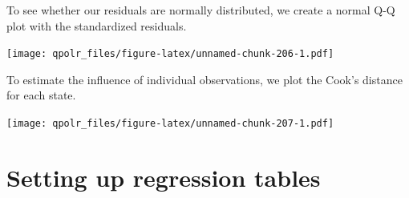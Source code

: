 \documentclass[12pt,oneside]{reedthesis}
\theoremstyle{definition}
\theoremstyle{definition}
\theoremstyle{definition}
\theoremstyle{remark}
\begin{document}
  To see whether our residuals are normally distributed, we create a
  normal Q-Q plot with the standardized residuals.
  \begin{Shaded}
  \begin{Highlighting}[]
  \OperatorTok{+}
  \StringTok{  }\NormalTok{(}\NormalTok{(}\OperatorTok{+}
  \StringTok{  }\NormalTok{() }\OperatorTok{+}
  \StringTok{  }\NormalTok{(} \NormalTok{,}
          \NormalTok{,}
          \NormalTok{)}
  \end{Highlighting}
  \end{Shaded}
  \texttt{[image: qpolr\_files/figure-latex/unnamed-chunk-206-1.pdf]}
  
  To estimate the influence of individual observations, we plot the Cook's
  distance for each state.
  \begin{Shaded}
  \begin{Highlighting}[]
  \NormalTok{(} \OperatorTok{+}
  \StringTok{  }\NormalTok{()  }\OperatorTok{+}
  \StringTok{  }\NormalTok{(} \NormalTok{,}
          \NormalTok{,}
          \NormalTok{)}
  \end{Highlighting}
  \end{Shaded}
  \texttt{[image: qpolr\_files/figure-latex/unnamed-chunk-207-1.pdf]}
  
  \section{Setting up regression
  tables}\label{setting-up-regression-tables}
  
\end{document}
